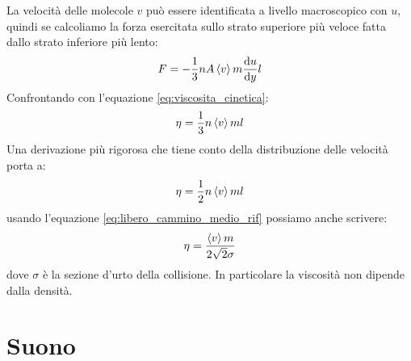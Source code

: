 La velocità delle molecole $v$ può essere identificata a livello macroscopico con $u$, quindi se calcoliamo la forza esercitata sullo strato superiore più veloce fatta dallo strato inferiore più lento:
\begin{equation}
	F =  -\frac{1}{3}n A\left<v\right> m\frac{\mathrm{d} u}{\mathrm{d} y}l
\end{equation}
Confrontando con l'equazione \eqref{eq:viscosita_cinetica}:
\begin{equation}
	\eta = \frac{1}{3}n\left<v\right> ml
\end{equation}
Una derivazione più rigorosa che tiene conto della distribuzione delle velocità porta a:
\begin{equation}
	\eta = \frac{1}{2}n\left<v\right> ml
\end{equation}
usando l'equazione \eqref{eq:libero_cammino_medio_rif} possiamo anche scrivere:
\begin{equation}
	\eta = \frac{\left<v\right>m}{2\sqrt{2}\sigma}
\end{equation}
dove $\sigma$ è la sezione d'urto della collisione. In particolare la viscosità non dipende dalla densità.

\section{Suono}
